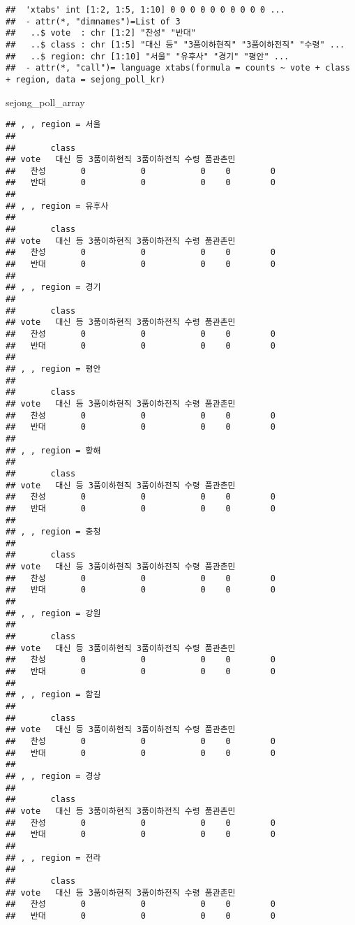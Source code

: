 \documentclass[
]{article}
\newenvironment{Shaded}{\begin{snugshade}}{\end{snugshade}}
\newcommand{\NormalTok}[1]{#1}
\begin{document}
\begin{verbatim}
##  'xtabs' int [1:2, 1:5, 1:10] 0 0 0 0 0 0 0 0 0 0 ...
##  - attr(*, "dimnames")=List of 3
##   ..$ vote  : chr [1:2] "찬성" "반대"
##   ..$ class : chr [1:5] "대신 등" "3품이하현직" "3품이하전직" "수령" ...
##   ..$ region: chr [1:10] "서울" "유후사" "경기" "평안" ...
##  - attr(*, "call")= language xtabs(formula = counts ~ vote + class + region, data = sejong_poll_kr)
\end{verbatim}

\begin{Shaded}
\begin{Highlighting}[]
\NormalTok{sejong\_poll\_array}
\end{Highlighting}
\end{Shaded}

\begin{verbatim}
## , , region = 서울
## 
##       class
## vote   대신 등 3품이하현직 3품이하전직 수령 품관촌민
##   찬성       0           0           0    0        0
##   반대       0           0           0    0        0
## 
## , , region = 유후사
## 
##       class
## vote   대신 등 3품이하현직 3품이하전직 수령 품관촌민
##   찬성       0           0           0    0        0
##   반대       0           0           0    0        0
## 
## , , region = 경기
## 
##       class
## vote   대신 등 3품이하현직 3품이하전직 수령 품관촌민
##   찬성       0           0           0    0        0
##   반대       0           0           0    0        0
## 
## , , region = 평안
## 
##       class
## vote   대신 등 3품이하현직 3품이하전직 수령 품관촌민
##   찬성       0           0           0    0        0
##   반대       0           0           0    0        0
## 
## , , region = 황해
## 
##       class
## vote   대신 등 3품이하현직 3품이하전직 수령 품관촌민
##   찬성       0           0           0    0        0
##   반대       0           0           0    0        0
## 
## , , region = 충청
## 
##       class
## vote   대신 등 3품이하현직 3품이하전직 수령 품관촌민
##   찬성       0           0           0    0        0
##   반대       0           0           0    0        0
## 
## , , region = 강원
## 
##       class
## vote   대신 등 3품이하현직 3품이하전직 수령 품관촌민
##   찬성       0           0           0    0        0
##   반대       0           0           0    0        0
## 
## , , region = 함길
## 
##       class
## vote   대신 등 3품이하현직 3품이하전직 수령 품관촌민
##   찬성       0           0           0    0        0
##   반대       0           0           0    0        0
## 
## , , region = 경상
## 
##       class
## vote   대신 등 3품이하현직 3품이하전직 수령 품관촌민
##   찬성       0           0           0    0        0
##   반대       0           0           0    0        0
## 
## , , region = 전라
## 
##       class
## vote   대신 등 3품이하현직 3품이하전직 수령 품관촌민
##   찬성       0           0           0    0        0
##   반대       0           0           0    0        0
\end{verbatim}
\end{document}

